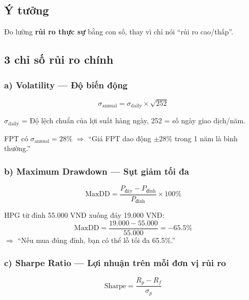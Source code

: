 \documentclass[12pt,a4paper]{article}
\begin{document}
\subsection{Ý tưởng}
Đo lường \textbf{rủi ro thực sự} bằng con số, thay vì chỉ nói ``rủi ro cao/thấp''.

\subsection{3 chỉ số rủi ro chính}

\subsubsection{a) Volatility — Độ biến động}

\begin{equation}
\boxed{
  \sigma_{\text{annual}} = \sigma_{\text{daily}} \times \sqrt{252}
}
\end{equation}

$\sigma_{\text{daily}}$ = Độ lệch chuẩn của lợi suất hàng ngày, 252 = số ngày giao dịch/năm.

\begin{examplebox}[Ví dụ]
FPT có $\sigma_{\text{annual}} = 28\%$ $\Rightarrow$ ``Giá FPT dao động $\pm 28\%$ trong 1 năm là bình thường.''
\end{examplebox}

\subsubsection{b) Maximum Drawdown — Sụt giảm tối đa}

\begin{equation}
\boxed{
  \text{MaxDD} = \frac{P_{\text{đáy}} - P_{\text{đỉnh}}}{P_{\text{đỉnh}}} \times 100\%
}
\end{equation}

\begin{examplebox}[Ví dụ]
HPG từ đỉnh 55.000 VNĐ xuống đáy 19.000 VNĐ:
$$\text{MaxDD} = \frac{19.000 - 55.000}{55.000} = -65.5\%$$
$\Rightarrow$ ``Nếu mua đúng đỉnh, bạn có thể lỗ tối đa 65.5\%.''
\end{examplebox}

\subsubsection{c) Sharpe Ratio — Lợi nhuận trên mỗi đơn vị rủi ro}

\begin{equation}
\boxed{
  \text{Sharpe} = \frac{R_p - R_f}{\sigma_p}
}
\end{equation}
\end{document}
